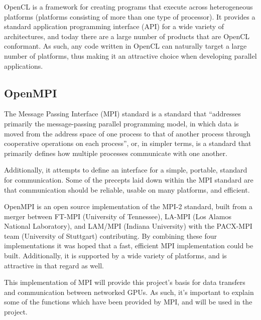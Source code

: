 \documentclass[../thesis.tex]{subfiles}
\begin{document}
        OpenCL is a framework for creating programs that execute across heterogeneous platforms (platforms consisting of more than one type of processor). It provides a standard application programming interface (API) for a wide variety of architectures, and today there are a large number of products that are OpenCL conformant\cite{khronosconformance}. As such, any code written in OpenCL can naturally target a large number of platforms, thus making it an attractive choice when developing parallel applications.  

    \subsection{OpenMPI} %
    \label{sub:openmpi}
        The Message Passing Interface (MPI) standard is a standard that ``addresses primarily the message-passing parallel programming model, in which data is moved from the address space of one process to that of another process through cooperative operations on each process''\cite{MPI-2.2}, or, in simpler terms, is a standard that primarily defines how multiple processes communicate with one another. 

        Additionally, it attempts to define an interface for a simple, portable, standard for communication. Some of the precepts laid down within the MPI standard are that communication should be reliable, usable on many platforms, and efficient.


        OpenMPI is an open source implementation of the MPI-2 standard, built from a merger between FT-MPI (University of Tennessee), LA-MPI (Los Alamos National Laboratory), and LAM/MPI (Indiana University) with the PACX-MPI team (University of Stuttgart) contributing. By combining these four implementations it was hoped that a fast, efficient MPI implementation could be built.\cite{openmpiwebsite} Additionally, it is supported by a wide variety of platforms, and is attractive in that regard as well.

        This implementation of MPI will provide this project's basis for data transfers and communication between networked GPUs. As such, it's important to explain some of the functions which have been provided by MPI, and will be used in the project.
\end{document}
